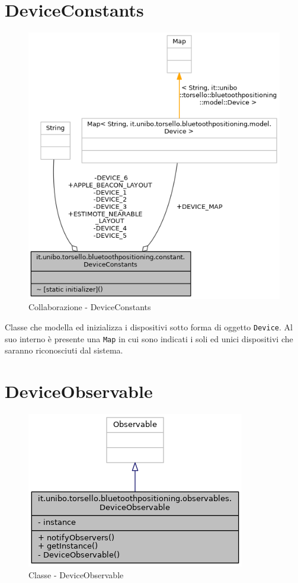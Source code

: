 \section{DeviceConstants}
\begin{figure}[ph]
	\centering
	\includegraphics[width=0.7\linewidth]{img/uml/class/classit_1_1unibo_1_1torsello_1_1bluetoothpositioning_1_1constant_1_1DeviceConstants__coll__graph.png}
	\caption{Collaborazione - DeviceConstants}
\end{figure}

Classe che modella ed inizializza i dispositivi sotto forma di oggetto \texttt{Device}. Al suo interno è presente una \texttt{Map} in cui sono indicati i soli ed unici dispositivi che saranno riconosciuti dal sistema.

\newpage
\section{DeviceObservable}
\begin{figure}[ph]
	\centering
	\includegraphics[width=0.7\linewidth]{img/uml/class/classit_1_1unibo_1_1torsello_1_1bluetoothpositioning_1_1observables_1_1DeviceObservable__inherit__graph.png}
	\caption{Classe - DeviceObservable}
\end{figure}

